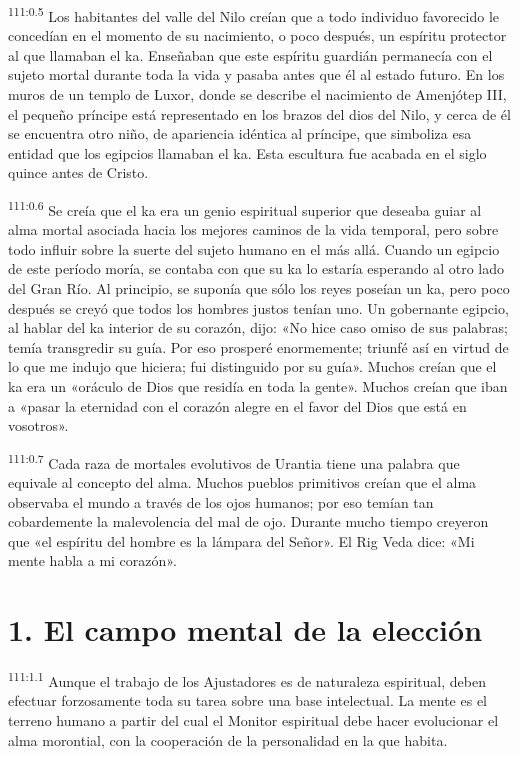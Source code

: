\par
\textsuperscript{111:0.5} Los habitantes del valle del Nilo creían que a todo individuo favorecido le concedían en el momento de su nacimiento, o poco después, un espíritu protector al que llamaban el ka. Enseñaban que este espíritu guardián permanecía con el sujeto mortal durante toda la vida y pasaba antes que él al estado futuro. En los muros de un templo de Luxor, donde se describe el nacimiento de Amenjótep III, el pequeño príncipe está representado en los brazos del dios del Nilo, y cerca de él se encuentra otro niño, de apariencia idéntica al príncipe, que simboliza esa entidad que los egipcios llamaban el ka. Esta escultura fue acabada en el siglo quince antes de Cristo.

\par
\textsuperscript{111:0.6} Se creía que el ka era un genio espiritual superior que deseaba guiar al alma mortal asociada hacia los mejores caminos de la vida temporal, pero sobre todo influir sobre la suerte del sujeto humano en el más allá. Cuando un egipcio de este período moría, se contaba con que su ka lo estaría esperando al otro lado del Gran Río. Al principio, se suponía que sólo los reyes poseían un ka, pero poco después se creyó que todos los hombres justos tenían uno. Un gobernante egipcio, al hablar del ka interior de su corazón, dijo: «No hice caso omiso de sus palabras; temía transgredir su guía. Por eso prosperé enormemente; triunfé así en virtud de lo que me indujo que hiciera; fui distinguido por su guía». Muchos creían que el ka era un «oráculo de Dios que residía en toda la gente». Muchos creían que iban a «pasar la eternidad con el corazón alegre en el favor del Dios que está en vosotros».

\par
\textsuperscript{111:0.7} Cada raza de mortales evolutivos de Urantia tiene una palabra que equivale al concepto del alma. Muchos pueblos primitivos creían que el alma observaba el mundo a través de los ojos humanos; por eso temían tan cobardemente la malevolencia del mal de ojo. Durante mucho tiempo creyeron que «el espíritu del hombre es la lámpara del Señor». El Rig Veda dice: «Mi mente habla a mi corazón».

\section*{1. El campo mental de la elección}
\par
\textsuperscript{111:1.1} Aunque el trabajo de los Ajustadores es de naturaleza espiritual, deben efectuar forzosamente toda su tarea sobre una base intelectual. La mente es el terreno humano a partir del cual el Monitor espiritual debe hacer evolucionar el alma morontial, con la cooperación de la personalidad en la que habita.

